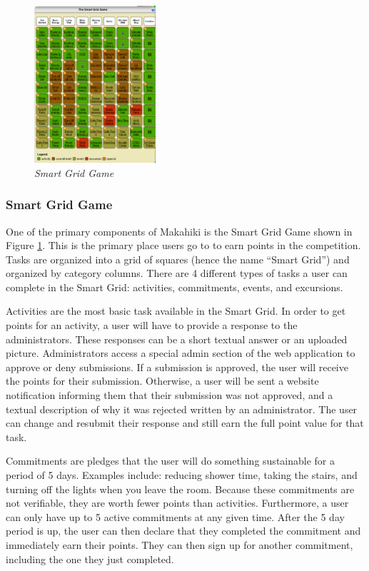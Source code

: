 \documentclass{acm_proc_article-sp}
\begin{document}
\begin{figure}[ht!]
  \center
  \includegraphics[width=0.4\textwidth]{smart-grid.eps}
  \caption{\em \small Smart Grid Game}
  \label{fig:SmartGrid}
\end{figure}

\subsubsection{Smart Grid Game}

One of the primary components of Makahiki is the Smart Grid Game shown in Figure \ref{fig:SmartGrid}. This is the primary place users go to to earn points in the competition. Tasks are organized into a grid of squares (hence the name ``Smart Grid'') and organized by category columns. There are 4 different types of tasks a user can complete in the Smart Grid: activities, commitments, events, and excursions.

Activities are the most basic task available in the Smart Grid. In order to get points for an activity, a user will have to provide a response to the administrators. These responses can be a short textual answer or an uploaded picture. Administrators access a special admin section of the web application to approve or deny submissions. If a submission is approved, the user will receive the points for their submission. Otherwise, a user will be sent a website notification informing them that their submission was not approved, and a textual description of why it was rejected written by an administrator. The user can change and resubmit their response and still earn the full point value for that task.

Commitments are pledges that the user will do something sustainable for a period of 5 days. Examples include: reducing shower time, taking the stairs, and turning off the lights when you leave the room. Because these commitments are not verifiable, they are worth fewer points than activities. Furthermore, a user can only have up to 5 active commitments at any given time. After the 5 day period is up, the user can then declare that they completed the commitment and immediately earn their points. They can then sign up for another commitment, including the one they just completed.
\end{document}
